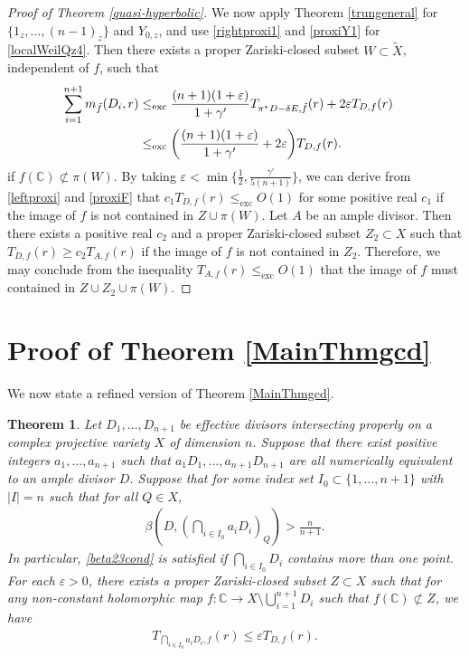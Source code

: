 \documentclass[10pt]{amsart}
\numberwithin{equation}{section}
\theoremstyle{plain}
\newtheorem{theorem}{Theorem}[section]
\theoremstyle{definition}
\begin{document}
\begin{proof}[Proof of Theorem \ref{quasi-hyperbolic}]
We now apply Theorem \ref{trungeneral} for $\{1_z,\hdots,(n-1)_z\}$ and $Y_{0,z}$,  and use
\eqref{rightproxi1} and \eqref{proxiY1} for \eqref{localWeilQz4}.  Then there exists a proper Zariski-closed subset  $W \subset \tilde X$, independent of $f$, such that  
\begin{align}\label{proxiF}
  \sum_{i=1}^{n+1}m_{\tilde f}( D_i,r)  
    &\leq_{\operatorname{exc}} \frac{(n+1)(1+\varepsilon)}{ 1+\gamma'}T_{\pi^*D-\delta E,\tilde f}(r)+2\varepsilon T_{D,f}(r) \cr
    & \leq_{\operatorname{exc}} \bigg(\frac{(n+1)(1+\varepsilon)}{ 1+\gamma'}+2\varepsilon\bigg) T_{D,f}(r).\end{align}
 if $ f(\mathbb{C})\not\subset \pi(W).$   By taking $\varepsilon<\min\bigg\{\frac12, \frac{\gamma'}{5(n+1)}\bigg\}$, we can derive from \eqref{leftproxi} and \eqref{proxiF} that 
$c_1T_{D,f}(r)\leq_{\operatorname{exc}}  O(1)$ for some positive real $c_1$ if the image of $f$ is not contained in $Z\cup\pi(W)$.  Let $A$ be an ample divisor.  Then there exists a positive real $c_2$ and a proper Zariski-closed subset $Z_2\subset X$ such that $T_{D,f}(r)\ge c_2 T_{A,f}(r)$ if the image of $f$ is not contained in $Z_2$.  Therefore, we may conclude from the inequality $T_{A,f}(r) \leq_{\operatorname{exc}}  O(1)$ that the image of $f$ must contained in  $Z\cup Z_2\cup \pi(W)$.
\end{proof}



\section{Proof of Theorem \ref{MainThmgcd}}\label{GCD}
We  now state a refined version of Theorem \ref{MainThmgcd}.

\begin{theorem}\label{complexgcd}
Let $D_1, \ldots,D_{n+1}$ be effective  divisors intersecting properly on a complex projective variety $X$ of dimension $n$. Suppose that there exist positive integers $a_1,\ldots, a_{n+1}$ such that $a_1D_1, \ldots, a_{n+1}D_{n+1}$ are all numerically equivalent to an ample divisor $D$.  
Suppose that for some index set $I_0 \subset \{1,\ldots,n+1\}$ with $|I|=n$ such that for all $Q\in X$, 
\begin{align}\label{beta23cond}
\beta(D,(\bigcap_{i \in I_0}a_iD_i)_Q)  > \frac{n}{n+1}. 
\end{align}
In particular, \eqref{beta23cond} is satisfied if $\bigcap_{i\in I_0}D_i$ contains more than one point. 
For each $\varepsilon>0$,   there exists a proper  Zariski-closed subset $Z\subset X$  such that for any non-constant holomorphic map $f:\mathbb{C}\to X\setminus{\bigcup_{i=1}^{n+1} } D_i$ such that  $f(\mathbb{C})\not\subset Z$,  we have 
\begin{align*}
T_{\bigcap_{i \in I_0}a_iD_i, f}(r) 
        \le \varepsilon  T_{D,f}(r). 
\end{align*}
\end{theorem}
\end{document}
